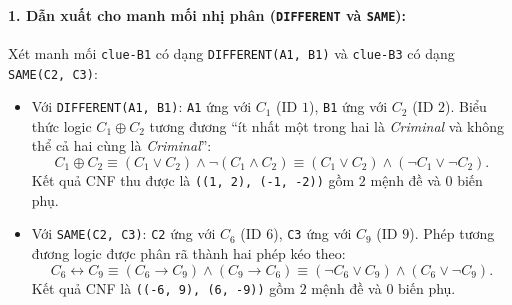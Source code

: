 \documentclass[12pt,a4paper]{article}
\begin{document}
\paragraph{1. Dẫn xuất cho manh mối nhị phân (\texttt{DIFFERENT} và \texttt{SAME}):}
Xét manh mối \texttt{clue-B1} có dạng \texttt{DIFFERENT(A1, B1)} và \texttt{clue-B3} có dạng \texttt{SAME(C2, C3)}:
\begin{itemize}
    \item Với \texttt{DIFFERENT(A1, B1)}: \texttt{A1} ứng với $C_1$ (ID $1$), \texttt{B1} ứng với $C_2$ (ID $2$). Biểu thức logic $C_1 \oplus C_2$ tương đương ``ít nhất một trong hai là \emph{Criminal} và không thể cả hai cùng là \emph{Criminal}'':
    \[
    C_1 \oplus C_2 \equiv (C_1 \lor C_2) \land \neg(C_1 \land C_2) \equiv (C_1 \lor C_2) \land (\neg C_1 \lor \neg C_2).
    \]
    Kết quả CNF thu được là \texttt{((1, 2), (-1, -2))} gồm $2$ mệnh đề và $0$ biến phụ.

    \item Với \texttt{SAME(C2, C3)}: \texttt{C2} ứng với $C_6$ (ID $6$), \texttt{C3} ứng với $C_9$ (ID $9$). Phép tương đương logic được phân rã thành hai phép kéo theo:
    \[
    C_6 \leftrightarrow C_9 \equiv (C_6 \to C_9) \land (C_9 \to C_6) \equiv (\neg C_6 \lor C_9) \land (C_6 \lor \neg C_9).
    \]
    Kết quả CNF là \texttt{((-6, 9), (6, -9))} gồm $2$ mệnh đề và $0$ biến phụ.
\end{itemize}
\end{document}
